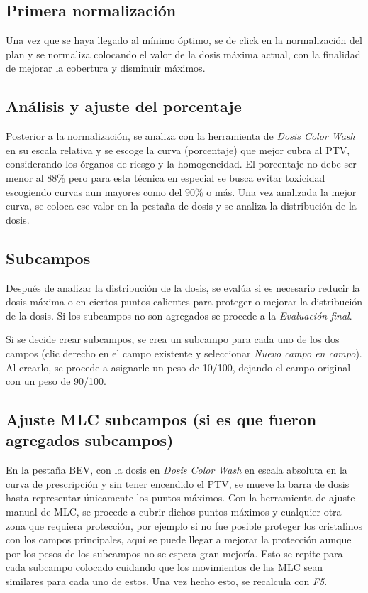 \documentclass{article}
\begin{document}
\subsection{Primera normalización}

Una vez que se haya llegado al mínimo óptimo, se de click en la normalización del plan y se normaliza colocando el valor de la dosis máxima actual, con la finalidad de mejorar la cobertura y disminuir máximos.

\subsection{Análisis y ajuste del porcentaje}

Posterior a la normalización, se analiza con la herramienta de \textit{Dosis Color Wash} en su escala relativa y se escoge la curva (porcentaje) que mejor cubra al PTV, considerando los órganos de riesgo y la homogeneidad. El porcentaje no debe ser menor al 88\% pero para esta técnica en especial se busca evitar toxicidad escogiendo curvas aun mayores como del 90\% o más. Una vez analizada la mejor curva, se coloca ese valor en la pestaña de dosis y se analiza la distribución de la dosis.

\subsection{Subcampos}

Después de analizar la distribución de la dosis, se evalúa si es necesario reducir la dosis máxima o en ciertos puntos calientes para proteger o mejorar la distribución de la dosis. Si los subcampos no son agregados se procede a la \textit{Evaluación final}.

Si se decide crear subcampos, se crea un subcampo para cada uno de los dos campos (clic derecho en el campo existente y seleccionar \textit{Nuevo campo en campo}). Al crearlo, se procede a asignarle un peso de 10/100, dejando el campo original con un peso de 90/100.

\subsection{Ajuste MLC subcampos (si es que fueron agregados subcampos)}

En la pestaña BEV, con la dosis en \textit{Dosis Color Wash} en escala absoluta en la curva de prescripción y sin tener encendido el PTV, se mueve la barra de dosis hasta representar únicamente los puntos máximos. Con la herramienta de ajuste manual de MLC, se procede a cubrir dichos puntos máximos y cualquier otra zona que requiera protección, por ejemplo si no fue posible proteger los cristalinos con los campos principales, aquí se puede llegar a mejorar la protección aunque por los pesos de los subcampos no se espera gran mejoría. Esto se repite para cada subcampo colocado cuidando que los movimientos de las MLC sean similares para cada uno de estos. Una vez hecho esto, se recalcula con \textit{F5}.
\end{document}
